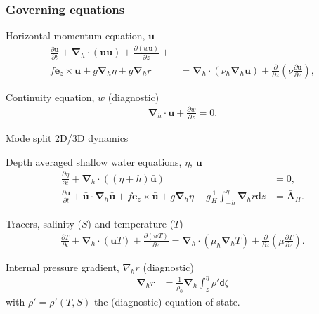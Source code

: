 \documentclass{beamer}
\renewcommand{\vec}[1]{\ensuremath{\boldsymbol{#1}}}
\newcommand{\ddt}[1]{\frac{\partial #1}{\partial t}}
\newcommand{\dd}[2]{\frac{\partial #1}{\partial #2}}
\newcommand{\nablah}{\ensuremath{\vec{\nabla}_{\!\!h}}}
\begin{document}
\begin{frame}[allowframebreaks]
\frametitle{Governing equations}
\begin{block}{Horizontal momentum equation, \vec{u}}
  \begin{align*}
    \ddt{\vec{u}} + \nablah \cdot (\vec{u}\vec{u})
    + \dd{(w\vec{u})}{z} +& \\
    f\vec{e}_z\times\vec{u} + g\nablah \eta + g\nablah r &= \nablah
      \cdot (\nu_h \nablah \vec{u}) + \dd{}{z}\left( \nu
        \dd{\vec{u}}{z}\right),
  \end{align*}
\end{block}
\begin{block}{Continuity equation, $w$ (diagnostic)}
  \begin{align*}
    \nablah \cdot \vec{u} + \dd{w}{z} = 0.
  \end{align*}
\end{block}
\pagebreak
Mode split 2D/3D dynamics

\begin{block}{Depth averaged shallow water equations, $\eta$,
    $\bar{\vec{u}}$}
\begin{align*}
\ddt{\eta} + \nablah \cdot ((\eta + h) \bar{\vec{u}}) &= 0, \\
 \ddt{\bar{\vec{u}}} + \bar{\vec{u}} \cdot \nablah\bar{\vec{u}} + f\vec{e}_z\times \bar{\vec{u}}
+ g \nablah \eta + g \frac{1}{H}\int_{-h}^\eta \nablah r \mathsf{d}z &=  \bar{\vec{A}}_H.
\end{align*}
\end{block}
\pagebreak

\begin{block}{Tracers, salinity ($S$) and temperature ($T$)}
\begin{align*}
\ddt{T} + \nablah \cdot (\vec{u} T) + \dd{(wT)}{z} =
 \nablah \cdot (\mu_h \nablah T) + \dd{}{z}\left( \mu  \dd{T}{z}\right).
\end{align*}
\end{block}
\begin{block}{Internal pressure gradient, $\nabla_h r$ (diagnostic)}
  \begin{align*}
    \nablah r &= \frac{1}{\rho_0} \nablah  \int_{z}^\eta  \rho' \mathsf{d}\zeta
  \end{align*}
  with $\rho' = \rho'(T, S)$ the (diagnostic) equation of state.
\end{block}
\pagebreak


\end{frame}
\end{document}

